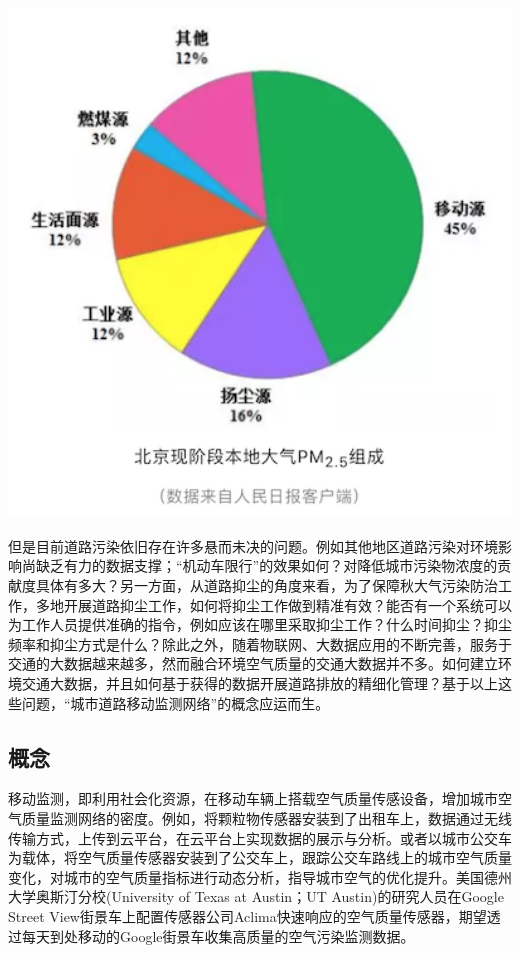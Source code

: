 \documentclass[]{book}
\begin{document}
\includegraphics[width=5.56in]{images/dlyd1}

但是目前道路污染依旧存在许多悬而未决的问题。例如其他地区道路污染对环境影响尚缺乏有力的数据支撑；``机动车限行''的效果如何？对降低城市污染物浓度的贡献度具体有多大？另一方面，从道路抑尘的角度来看，为了保障秋大气污染防治工作，多地开展道路抑尘工作，如何将抑尘工作做到精准有效？能否有一个系统可以为工作人员提供准确的指令，例如应该在哪里采取抑尘工作？什么时间抑尘？抑尘频率和抑尘方式是什么？除此之外，随着物联网、大数据应用的不断完善，服务于交通的大数据越来越多，然而融合环境空气质量的交通大数据并不多。如何建立环境交通大数据，并且如何基于获得的数据开展道路排放的精细化管理？基于以上这些问题，``城市道路移动监测网络''的概念应运而生。

\subsection{概念}

移动监测，即利用社会化资源，在移动车辆上搭载空气质量传感设备，增加城市空气质量监测网络的密度。例如，将颗粒物传感器安装到了出租车上，数据通过无线传输方式，上传到云平台，在云平台上实现数据的展示与分析。或者以城市公交车为载体，将空气质量传感器安装到了公交车上，跟踪公交车路线上的城市空气质量变化，对城市的空气质量指标进行动态分析，指导城市空气的优化提升。美国德州大学奥斯汀分校(University
of Texas at Austin；UT Austin)的研究人员在Google Street
View街景车上配置传感器公司Aclima快速响应的空气质量传感器，期望透过每天到处移动的Google街景车收集高质量的空气污染监测数据。
\end{document}
